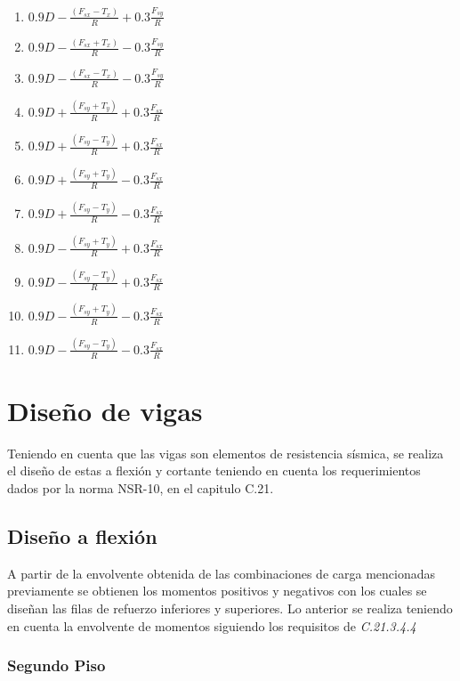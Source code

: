 \documentclass[12pt]{article}
\begin{document}
\begin{multicols}{2}
\begin{enumerate}
    \item $0.9D-\frac{(F_{sx}-T_{x})}{R}+0.3\frac{F_{sy}}{R}$
    \item $0.9D-\frac{(F_{sx}+T_{x})}{R}-0.3\frac{F_{sy}}{R}$
    \item $0.9D-\frac{(F_{sx}-T_{x})}{R}-0.3\frac{F_{sy}}{R}$
    \item $0.9D+\frac{(F_{sy}+T_{y})}{R}+0.3\frac{F_{sx}}{R}$
    \item $0.9D+\frac{(F_{sy}-T_{y})}{R}+0.3\frac{F_{sx}}{R}$
    \item $0.9D+\frac{(F_{sy}+T_{y})}{R}-0.3\frac{F_{sx}}{R}$
    \item $0.9D+\frac{(F_{sy}-T_{y})}{R}-0.3\frac{F_{sx}}{R}$
    \item $0.9D-\frac{(F_{sy}+T_{y})}{R}+0.3\frac{F_{sx}}{R}$
    \item $0.9D-\frac{(F_{sy}-T_{y})}{R}+0.3\frac{F_{sx}}{R}$
    \item $0.9D-\frac{(F_{sy}+T_{y})}{R}-0.3\frac{F_{sx}}{R}$
    \item $0.9D-\frac{(F_{sy}-T_{y})}{R}-0.3\frac{F_{sx}}{R}$
\end{enumerate}
\end{multicols}

\section{Diseño de vigas}
Teniendo en cuenta que las vigas son elementos de resistencia sísmica, se realiza el diseño de estas a flexión y cortante teniendo en cuenta los requerimientos dados por la norma NSR-10, en el capitulo C.21.\\

\subsection{Diseño a flexión}
A partir de la envolvente obtenida de las combinaciones de carga mencionadas previamente se obtienen los momentos positivos y negativos con los cuales se diseñan las filas de refuerzo inferiores y superiores. Lo anterior se realiza teniendo en cuenta la envolvente de momentos siguiendo los requisitos de \textit{C.21.3.4.4}
\subsubsection*{Segundo Piso}









\end{document}
